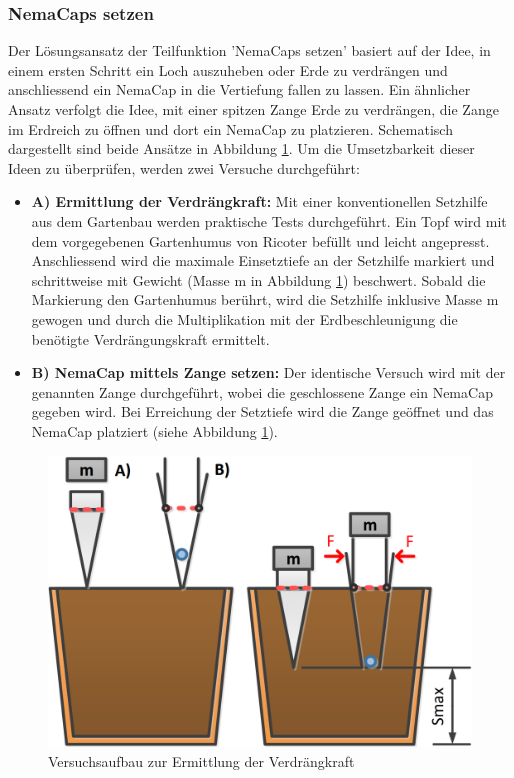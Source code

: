 \subsubsection{NemaCaps setzen}
Der Lösungsansatz der Teilfunktion 'NemaCaps setzen' basiert auf der Idee, in einem ersten Schritt ein Loch auszuheben oder Erde zu verdrängen und anschliessend ein NemaCap in die Vertiefung fallen zu lassen. Ein ähnlicher Ansatz verfolgt die Idee, mit einer spitzen Zange Erde zu verdrängen, die Zange im Erdreich zu öffnen und dort ein NemaCap zu platzieren. Schematisch dargestellt sind beide Ansätze in Abbildung \ref{fig:skizze_setzversuch}.
\newline
Um die Umsetzbarkeit dieser Ideen zu überprüfen, werden zwei Versuche durchgeführt:
\begin{itemize}
	\item \textbf{A) Ermittlung der Verdrängkraft:} Mit einer konventionellen Setzhilfe aus dem Gartenbau werden praktische Tests durchgeführt. Ein Topf wird mit dem vorgegebenen Gartenhumus von Ricoter befüllt und leicht angepresst. Anschliessend wird die maximale Einsetztiefe an der Setzhilfe markiert und schrittweise mit Gewicht (Masse m in Abbildung \ref{fig:skizze_setzversuch}) beschwert. Sobald die Markierung den Gartenhumus berührt, wird die Setzhilfe inklusive Masse m gewogen und durch die Multiplikation mit der Erdbeschleunigung die benötigte Verdrängungskraft ermittelt.
		
	\item \textbf{B) NemaCap mittels Zange setzen:} Der identische Versuch wird mit der genannten Zange durchgeführt, wobei die geschlossene Zange ein NemaCap gegeben wird. Bei Erreichung der Setztiefe wird die Zange geöffnet und das NemaCap platziert (siehe Abbildung \ref{fig:skizze_setzversuch}).
\end{itemize} 

\begin{figure}[H]
	\includegraphics[width=1\textwidth]{Illustrationen/5-Konzept/skizze_stechversuch.PNG}
	\caption{Versuchsaufbau zur Ermittlung der Verdrängkraft}
	\label{fig:skizze_setzversuch}
\end{figure}

